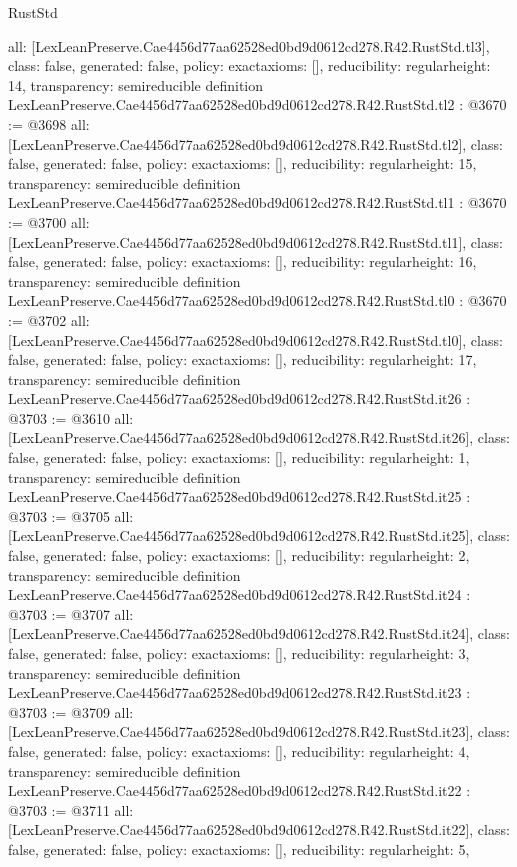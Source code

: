 \begin{lexlean}{RustStd}
\begin{coremodule}
{  all: [LexLeanPreserve.Cae4456d77aa62528ed0bd9d0612cd278.R42.RustStd.tl3],
  class: false,
  generated: false,
  policy: exact{axioms: []},
  reducibility: regular{height: 14},
  transparency: semireducible
}
definition LexLeanPreserve.Cae4456d77aa62528ed0bd9d0612cd278.R42.RustStd.tl2 : @3670 := @3698 {
  all: [LexLeanPreserve.Cae4456d77aa62528ed0bd9d0612cd278.R42.RustStd.tl2],
  class: false,
  generated: false,
  policy: exact{axioms: []},
  reducibility: regular{height: 15},
  transparency: semireducible
}
definition LexLeanPreserve.Cae4456d77aa62528ed0bd9d0612cd278.R42.RustStd.tl1 : @3670 := @3700 {
  all: [LexLeanPreserve.Cae4456d77aa62528ed0bd9d0612cd278.R42.RustStd.tl1],
  class: false,
  generated: false,
  policy: exact{axioms: []},
  reducibility: regular{height: 16},
  transparency: semireducible
}
definition LexLeanPreserve.Cae4456d77aa62528ed0bd9d0612cd278.R42.RustStd.tl0 : @3670 := @3702 {
  all: [LexLeanPreserve.Cae4456d77aa62528ed0bd9d0612cd278.R42.RustStd.tl0],
  class: false,
  generated: false,
  policy: exact{axioms: []},
  reducibility: regular{height: 17},
  transparency: semireducible
}
definition LexLeanPreserve.Cae4456d77aa62528ed0bd9d0612cd278.R42.RustStd.it26 : @3703 := @3610 {
  all: [LexLeanPreserve.Cae4456d77aa62528ed0bd9d0612cd278.R42.RustStd.it26],
  class: false,
  generated: false,
  policy: exact{axioms: []},
  reducibility: regular{height: 1},
  transparency: semireducible
}
definition LexLeanPreserve.Cae4456d77aa62528ed0bd9d0612cd278.R42.RustStd.it25 : @3703 := @3705 {
  all: [LexLeanPreserve.Cae4456d77aa62528ed0bd9d0612cd278.R42.RustStd.it25],
  class: false,
  generated: false,
  policy: exact{axioms: []},
  reducibility: regular{height: 2},
  transparency: semireducible
}
definition LexLeanPreserve.Cae4456d77aa62528ed0bd9d0612cd278.R42.RustStd.it24 : @3703 := @3707 {
  all: [LexLeanPreserve.Cae4456d77aa62528ed0bd9d0612cd278.R42.RustStd.it24],
  class: false,
  generated: false,
  policy: exact{axioms: []},
  reducibility: regular{height: 3},
  transparency: semireducible
}
definition LexLeanPreserve.Cae4456d77aa62528ed0bd9d0612cd278.R42.RustStd.it23 : @3703 := @3709 {
  all: [LexLeanPreserve.Cae4456d77aa62528ed0bd9d0612cd278.R42.RustStd.it23],
  class: false,
  generated: false,
  policy: exact{axioms: []},
  reducibility: regular{height: 4},
  transparency: semireducible
}
definition LexLeanPreserve.Cae4456d77aa62528ed0bd9d0612cd278.R42.RustStd.it22 : @3703 := @3711 {
  all: [LexLeanPreserve.Cae4456d77aa62528ed0bd9d0612cd278.R42.RustStd.it22],
  class: false,
  generated: false,
  policy: exact{axioms: []},
  reducibility: regular{height: 5},
}
\end{coremodule}
\end{lexlean}
